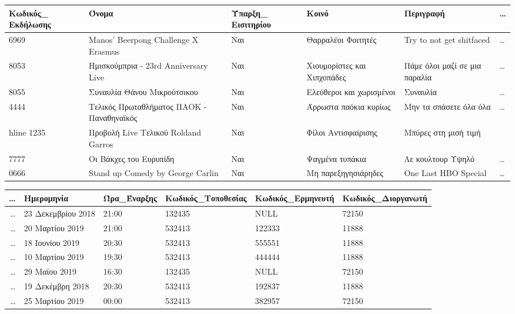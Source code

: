 \begin{table}[H]
  \centering
  \footnotesize
  \begin{tabular}{|p{1.6cm}|p{2.8cm}|p{1.5cm}|l|l|l}
  \hline
  Κωδικός\_ Εκδήλωσης & Όνομα                               
    & Ύπαρξη\_ Εισιτηρίου & Κοινό              & Περιγραφή & \ldots \\ \hline
  6969               & Manos' Beerpong Challenge X Erasmus 
    & Ναι                & Θαρραλέοι Φοιτητές & Try to not get
                                                shitfaced & \ldots  \\ \hline
  8053               & Ημισκούμπρια - 23rd Anniversary Live
    & Ναι            & Χιουμορίστες και Χιπχοπάδες & Πάμε όλοι μαζί σε μια παραλία & \ldots  \\ \hline
  8055               & Συναυλία Θάνου Μικρούτσικου & Ναι
    & Ελεύθεροι και χωρισμένοι & Συναυλία & \ldots  \\ \hline
  4444               & Τελικός Πρωταθλήματος ΠΑΟΚ - Παναθηναϊκός
    & Ναι            & Άρρωστα παόκια κυρίως & Μην τα σπάσετε όλα όλα & \ldots \\hline
  1235               & Προβολή Live Τελικού Roldand Garros 
    & Ναι            & Φίλοι Αντισφαίρισης & Μπύρες στη μισή τιμή   \\ \hline
  7777               & Οι Βάκχες του Ευρυπίδη & Ναι
    & Ψαγμένα τυπάκια & Λε κουλτουρ Υψηλό & \ldots \\ \hline
  0666               & Stand up Comedy by George Carlin
    & Ναι            & Μη παρεξηγησιάρηδες & One Last HBO Special & \ldots \\ \hline
  \end{tabular}
   \begin{tabular}{r|l|l|l|l|l|}
  \hline
  \ldots & Ημερομηνία         & Ώρα\_Έναρξης & Κωδικός\_Τοποθεσίας & Κωδικός\_Ερμηνευτή & Κωδικός\_Διοργανωτή \\ \hline
  \ldots & 23 Δεκεμβρίου 2018 & 21:00        & 132435              & NULL               & 72150               \\ \hline
  \ldots & 20 Μαρτίου 2019    & 21:00        & 532413              & 122333             & 11888               \\ \hline
  \ldots & 18 Ιουνίου 2019    & 20:30        & 532413              & 555551             & 11888               \\ \hline
  \ldots & 10 Μαρτίου 2019    & 19:30        & 532413              & 444444             & 11888               \\ \hline
  \ldots & 29 Μαϊου 2019      & 16:30        & 132435              & NULL               & 72150               \\ \hline
  \ldots & 19 Δεκέμβρη 2018   & 20:30        & 532413              & 192837             & 11888               \\ \hline
  \ldots & 25 Μαρτίου 2019    & 00:00        & 532413              & 382957             & 72150               \\ \hline
\end{tabular}
\end{table}
  
